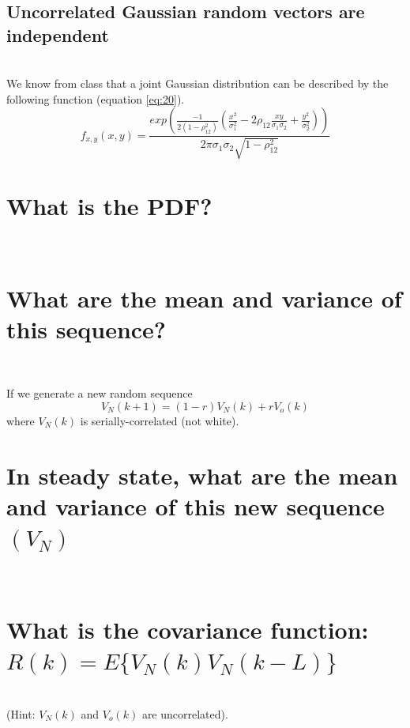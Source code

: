\documentclass[12pt,letterpaper, onecolumn]{exam}
\begin{document}
\begin{questions}
\begin{parts}
        \part{Uncorrelated Gaussian random vectors are independent}\\
		        \solution
		        We know from class that a joint Gaussian distribution can be described by the following function (equation \ref{eq:20}).\\
		        \begin{equation}\label{eq:20}
		            f_{x,y}(x,y) = \frac{exp\left(\frac{-1}{2(1 - \rho_{12}^2)}\left(\frac{x^2}{\sigma_1^2} - 2\rho_{12}\frac{xy}{\sigma_1\sigma_2}+\frac{y^2}{\sigma^2_2}\right) \right)}{2\pi\sigma_1\sigma_2\sqrt{1 - \rho_{12}^2}}
		        \end{equation}
    \end{parts}
    \clearpage
    \begin{parts}
        \part{What is the PDF?}\\
		        \solution
        \part{What are the mean and variance of this sequence?}\\
		        \solution

		        If we generate a new random sequence \[V_N(k+1) = (1 - r)V_N(k) + rV_o(k)\]where $V_N(k)$ is serially-correlated (not white).
        \part{In steady state, what are the mean and variance of this new sequence $(V_N)$}\\
		        \solution
        \part{What is the covariance function: $R(k) = E\{V_N(k)V_N(k-L)\}$}\\
		        (Hint: $V_N(k)$ and $V_o(k)$ are uncorrelated).\\
		        \solution

\end{parts}
\end{questions}
\end{document}
